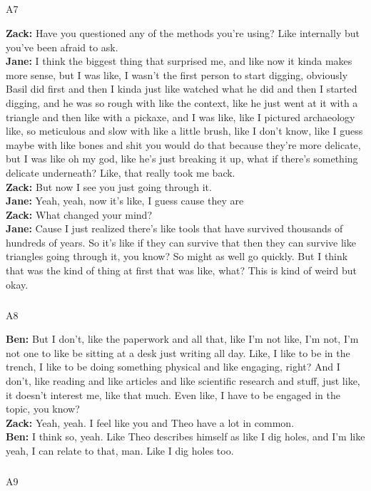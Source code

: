 \documentclass[
]{article}
\makeatletter
\let\oldsubparagraph\subparagraph
\renewcommand{\subparagraph}{
    \@ifstar
      \xxxSubParagraphStar
      \xxxSubParagraphNoStar
  }
\newcommand{\xxxSubParagraphStar}[1]{\oldsubparagraph*{#1}\mbox{}}
\newcommand{\xxxSubParagraphNoStar}[1]{\oldsubparagraph{#1}\mbox{}}
\makeatother
\begin{document}
\subparagraph{A7}\label{sec-A7}

\textbf{Zack:} Have you questioned any of the methods you're using? Like
internally but you've been afraid to ask.\\
\textbf{Jane:} I think the biggest thing that surprised me, and like now
it kinda makes more sense, but I was like, I wasn't the first person to
start digging, obviously Basil did first and then I kinda just like
watched what he did and then I started digging, and he was so rough with
like the context, like he just went at it with a triangle and then like
with a pickaxe, and I was like, like I pictured archaeology like, so
meticulous and slow with like a little brush, like I don't know, like I
guess maybe with like bones and shit you would do that because they're
more delicate, but I was like oh my god, like he's just breaking it up,
what if there's something delicate underneath? Like, that really took me
back.\\
\textbf{Zack:} But now I see you just going through it.\\
\textbf{Jane:} Yeah, yeah, now it's like, I guess cause they are\\
\textbf{Zack:} What changed your mind?\\
\textbf{Jane:} Cause I just realized there's like tools that have
survived thousands of hundreds of years. So it's like if they can
survive that then they can survive like triangles going through it, you
know? So might as well go quickly. But I think that was the kind of
thing at first that was like, what? This is kind of weird but okay.

\subparagraph{A8}\label{sec-A8}

\textbf{Ben:} But I don't, like the paperwork and all that, like I'm not
like, I'm not, I'm not one to like be sitting at a desk just writing all
day. Like, I like to be in the trench, I like to be doing something
physical and like engaging, right? And I don't, like reading and like
articles and like scientific research and stuff, just like, it doesn't
interest me, like that much. Even like, I have to be engaged in the
topic, you know?\\
\textbf{Zack:} Yeah, yeah. I feel like you and Theo have a lot in
common.\\
\textbf{Ben:} I think so, yeah. Like Theo describes himself as like I
dig holes, and I'm like yeah, I can relate to that, man. Like I dig
holes too.

\subparagraph{A9}\label{sec-A9}
\end{document}
